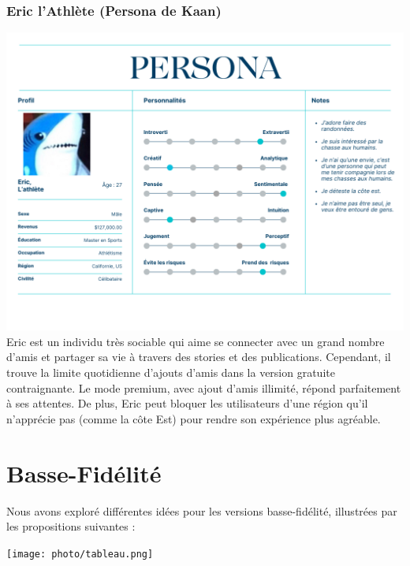 \documentclass{article}
\begin{document}
\subsubsection*{Eric l’Athlète (Persona de Kaan)}
\includegraphics[width=1\textwidth]{photo/Personna_Kaan.png}\\

Eric est un individu très sociable qui aime se connecter avec un grand nombre d’amis et partager 
sa vie à travers des stories et des publications. 
Cependant, il trouve la limite quotidienne d’ajouts d’amis dans la version gratuite contraignante. 
Le mode premium, avec ajout d’amis illimité, répond parfaitement à ses attentes. 
De plus, Eric peut bloquer les utilisateurs d’une région qu’il n’apprécie pas (comme la côte Est) 
pour rendre son expérience plus agréable.



\section{Basse-Fidélité}
Nous avons exploré différentes idées pour les versions basse-fidélité, illustrées par 
les propositions suivantes : 

\texttt{[image: photo/tableau.png]}
\end{document}
